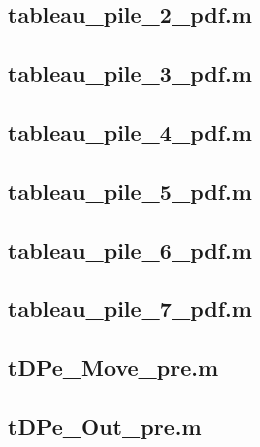 \documentclass[runningheads,a4paper]{llncs}
\newcommand{\GPenSIM}{../GPenSIM}
\begin{document}
\subsection{tableau\_pile\_2\_pdf.m}
\label{app:tableau_pile_2_pdf.m}


\subsection{tableau\_pile\_3\_pdf.m}
\label{app:tableau_pile_3_pdf.m}


\subsection{tableau\_pile\_4\_pdf.m}
\label{app:tableau_pile_4_pdf.m}


\subsection{tableau\_pile\_5\_pdf.m}
\label{app:tableau_pile_5_pdf.m}


\subsection{tableau\_pile\_6\_pdf.m}
\label{app:tableau_pile_6_pdf.m}


\subsection{tableau\_pile\_7\_pdf.m}
\label{app:tableau_pile_7_pdf.m}


\subsection{tDPe\_Move\_pre.m}
\label{app:tDPe_Move_pre.m}


\subsection{tDPe\_Out\_pre.m}
\label{app:tDPe_Out_pre.m}

\end{document}
